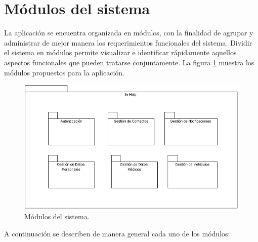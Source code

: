 
\section{Módulos del sistema}

La aplicación se encuentra organizada en módulos, con la finalidad de agrupar y administrar de mejor manera los requerimientos funcionales del sistema. Dividir el sistema en módulos permite visualizar e identificar rápidamente aquellos aspectos funcionales que pueden tratarse conjuntamente. La figura \ref{fig:modulos} muestra los módulos propuestos para la aplicación.

\begin{figure}[h!]
	\begin{center}
		\includegraphics[scale=0.7]{ModeloComportamiento/imagenes/modulosSistema.png}
		\caption{Módulos del sistema.}
		\label{fig:modulos}
	\end{center}
\end{figure}
\pagebreak

A continuación se describen de manera general cada uno de los módulos:

